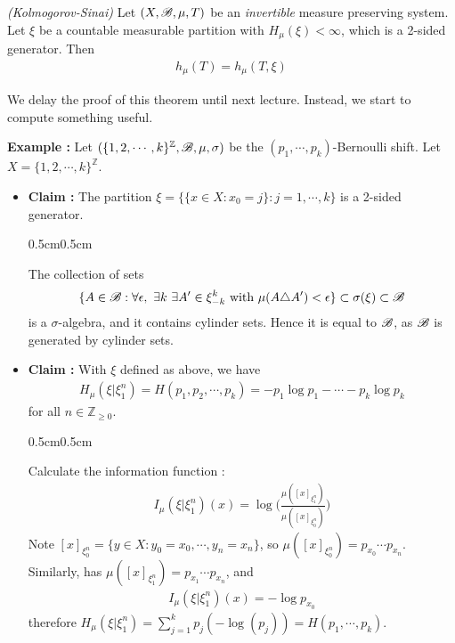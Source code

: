 \documentclass[10pt,a4paper]{report}
\newenvironment{subproof}
{\begin{changemargin}{0.5cm}{0.5cm}
	}%
	{\end{changemargin}
}
\begin{document}
\thm \emph{(Kolmogorov-Sinai)} Let $(X,\mathscr{B}, \mu, T)$ be an \emph{invertible} measure preserving system. Let $\xi$ be a countable measurable partition with $H_{\mu}(\xi) < \infty$, which is a 2-sided generator. Then
\begin{align*}
h_{\mu}(T) = h_{\mu}(T,\xi)
\end{align*}
\s

We delay the proof of this theorem until next lecture. Instead, we start to compute something useful.
\s

\textbf{Example :} Let $(\{1,2,\cdots, k\}^{\mathbb{Z}}, \mathscr{B}, \mu, \sigma)$ be the $(p_1, \cdots, p_k)$-Bernoulli shift. Let $X =\{1,2,\cdots, k\}^{\mathbb{Z}}$.
\begin{itemize}
\item \textbf{Claim :} The partition $\xi = \{ \{x\in X: x_0 =j \} : j=1, \cdots, k \}$ is a 2-sided generator.
\begin{subproof}
\pf The collection of sets
\begin{align*}
\{ A\in \mathscr{B} : \forall \epsilon, \,\, \exists k \,\, \exists A' \in \xi^{k}_{-k} \text{ with } \mu(A\triangle A') < \epsilon \} \subset \sigma(\xi) \subset \mathscr{B}
\end{align*}
is a $\sigma$-algebra, and it contains cylinder sets. Hence it is equal to $\mathscr{B}$, as $\mathscr{B}$ is generated by cylinder sets.

\eop
\end{subproof}
\s

\item \textbf{Claim :} With $\xi$ defined as above, we have 
\begin{align*}
H_{\mu}(\xi | \xi_{1}^n) = H(p_1, p_2, \cdots, p_k) = -p_1 \log p_1 -\cdots -p_k \log p_k
\end{align*}
for all $n \in \mathbb{Z}_{\geq 0}$.
\begin{subproof}
\pf Calculate the information function : 
\begin{align*}
I_{\mu}(\xi | \xi_1^n) (x)  = \log \Big( \frac{\mu([x]_{\xi_1^n})}{\mu([x]_{\xi_0^n})} \Big)
\end{align*}
Note $[x]_{\xi_0^n} = \{y\in X : y_0=x_0, \cdots, y_n =x_n \}$, so $\mu([x]_{\xi_0^n}) = p_{x_0}\cdots p_{x_n}$. Similarly, has $\mu([x]_{\xi_1^n})=p_{x_1} \cdots p_{x_n}$, and
\begin{align*}
I_{\mu}(\xi|\xi_1^n) (x) = - \log p_{x_0} 
\end{align*}
therefore $H_{\mu} (\xi |\xi_1^n) = \sum_{j=1}^{k} p_j (-\log (p_j)) = H(p_1, \cdots, p_k)$. 


\end{subproof}
\end{itemize}
\end{document}
